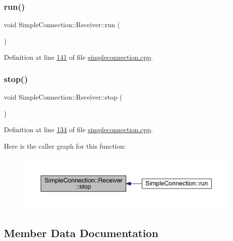 \subsubsection{\texorpdfstring{run()}{run()}}
{\footnotesize\ttfamily void Simple\+Connection\+::\+Receiver\+::run (\begin{DoxyParamCaption}{ }\end{DoxyParamCaption})\hspace{0.3cm}{\ttfamily [protected]}}



Definition at line \hyperlink{a00005_source_l00141}{141} of file \hyperlink{a00005_source}{simpleconnection.\+cpp}.

\mbox{\label{a00133_ab77d06e9677b12631ece8695a319e062}} 
\subsubsection{\texorpdfstring{stop()}{stop()}}
{\footnotesize\ttfamily void Simple\+Connection\+::\+Receiver\+::stop (\begin{DoxyParamCaption}{ }\end{DoxyParamCaption})}



Definition at line \hyperlink{a00005_source_l00134}{134} of file \hyperlink{a00005_source}{simpleconnection.\+cpp}.

Here is the caller graph for this function\+:
\nopagebreak
\begin{figure}[H]
\begin{center}
\leavevmode
\includegraphics[width=350pt]{d0/de8/a00133_ab77d06e9677b12631ece8695a319e062_icgraph}
\end{center}
\end{figure}


\subsection{Member Data Documentation}
\mbox{\label{a00133_aa4c39c627b02662a6f68885aa8fca85b}} 
